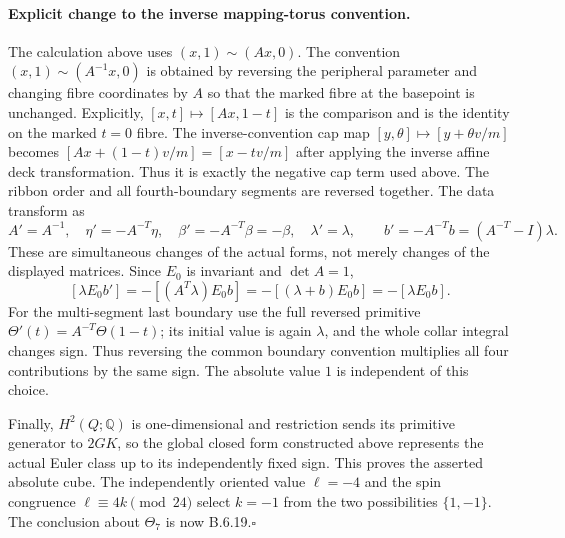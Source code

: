 \paragraph{Explicit change to the inverse mapping-torus convention.}
The calculation above uses $(x,1)\sim(Ax,0)$. The convention
$(x,1)\sim(A^{-1}x,0)$ is obtained by reversing the peripheral
parameter and changing fibre coordinates by $A$ so that the marked fibre
at the basepoint is unchanged. Explicitly,
$[x,t]\mapsto[Ax,1-t]$ is the comparison and is the identity on the marked
$t=0$ fibre. The inverse-convention cap map
$[y,\theta]\mapsto[y+\theta v/m]$ becomes
$[Ax+(1-t)v/m]=[x-tv/m]$ after applying the inverse affine deck
transformation. Thus it is exactly the negative cap term used above.
The ribbon order and all fourth-boundary segments are reversed together.
The data transform as
\[
 A'=A^{-1},\quad \eta'=-A^{-T}\eta,\quad
 \beta'=-A^{-T}\beta=-\beta,\quad\lambda'=\lambda,
 \qquad b'=-A^{-T}b=(A^{-T}-I)\lambda.
\]
These are simultaneous changes of the actual forms, not merely changes
of the displayed matrices. Since $E_0$ is invariant and $\det A=1$,
\[
 [\lambda E_0b']=-[(A^T\lambda)E_0b]
                =-[(\lambda+b)E_0b]=-[\lambda E_0b].
\]
For the multi-segment last boundary use the full reversed primitive
$\Theta'(t)=A^{-T}\Theta(1-t)$; its initial value is again $\lambda$,
and the whole collar integral changes sign. Thus reversing the common
boundary convention multiplies all four contributions by the same sign.
The absolute value $1$ is independent of this choice.

Finally, $H^2(Q;\mathbb Q)$ is one-dimensional and restriction sends its
primitive generator to $2GK$, so the global closed form constructed
above represents the actual Euler class up to its independently fixed
sign. This proves the asserted absolute cube. The independently oriented
value $\ell=-4$ and the spin congruence $\ell\equiv4k\pmod{24}$ select
$k=-1$ from the two possibilities $\{1,-1\}$. The conclusion about
$\Theta_7$ is now B.6.19.\hfill$\square$
